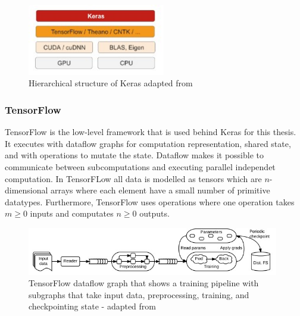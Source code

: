 \begin{figure}[ht!]
  \centering
  \includegraphics[width=6cm]{pictures/keras_layer.jpg}
  \caption{Hierarchical structure of Keras adapted from \cite{chollet_francois_2018}}
  \label{fig:keras_layer}
\end{figure}

\subsubsection*{TensorFlow}

TensorFlow \cite{DBLP:journals/corr/AbadiBCCDDDGIIK16} is the low-level framework that is used behind Keras \cite{moolayil_2019} for this thesis. It executes with dataflow graphs for computation representation, shared state, and with operations to mutate the state. Dataflow makes it possible to communicate between subcomputations and executing parallel independet computation. In TensorFLow all data is modelled as tensors which are $n$-dimensional arrays where each element have a small number of primitive datatypes. Furthermore, TensorFlow uses operations where one operation takes $m \geq 0$ inputs and computates $n \geq 0$ outputs.

\begin{figure}[ht!]
  \centering
  \includegraphics[width=11cm]{pictures/tensorflow_dataflow.jpg}
  \caption{TensorFlow dataflow graph that shows a training pipeline with subgraphs that take input data, preprocessing, training, and checkpointing state - adapted from \cite{DBLP:journals/corr/AbadiBCCDDDGIIK16}}
  \label{fig:tensorflow_dataflow}
\end{figure}
